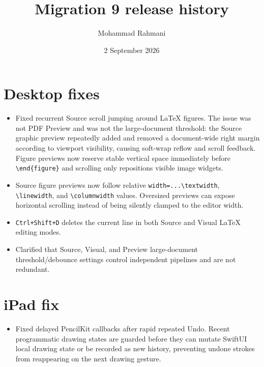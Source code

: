 \documentclass[a4paper]{article}
\title{Migration 9 release history}
\date{2 September 2026}
\author{Mohammad Rahmani}
\begin{document}
\maketitle

\section{Desktop fixes}
\begin{itemize}
    \item Fixed recurrent Source scroll jumping around LaTeX figures. The issue was not PDF Preview and was not the large-document threshold: the Source graphic preview repeatedly added and removed a document-wide right margin according to viewport visibility, causing soft-wrap reflow and scroll feedback. Figure previews now reserve stable vertical space immediately before \verb|\end{figure}| and scrolling only repositions visible image widgets.
    \item Source figure previews now follow relative \verb|width=...\textwidth|, \verb|\linewidth|, and \verb|\columnwidth| values. Oversized previews can expose horizontal scrolling instead of being silently clamped to the editor width.
    \item \verb|Ctrl+Shift+D| deletes the current line in both Source and Visual LaTeX editing modes.
    \item Clarified that Source, Visual, and Preview large-document threshold/debounce settings control independent pipelines and are not redundant.
\end{itemize}

\section{iPad fix}
\begin{itemize}
    \item Fixed delayed PencilKit callbacks after rapid repeated Undo. Recent programmatic drawing states are guarded before they can mutate SwiftUI local drawing state or be recorded as new history, preventing undone strokes from reappearing on the next drawing gesture.
\end{itemize}



\end{document}
